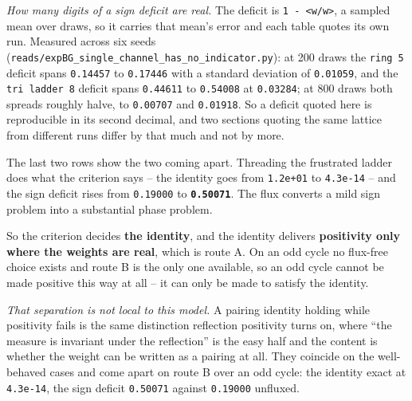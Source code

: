 \documentclass[10pt,letterpaper,twocolumn]{article}
\begin{document}
\emph{How many digits of a sign deficit are real.} The deficit is \texttt{1\ -{}\allowbreak{}\ \textbar{}\allowbreak{}\textless{}\allowbreak{}w/\allowbreak{}\textbar{}\allowbreak{}w\textbar{}\allowbreak{}\textgreater{}\allowbreak{}\textbar{}\allowbreak{}}, a sampled mean over
draws, so it carries that mean's error and each table quotes its own run. Measured across six
seeds (\texttt{reads/\allowbreak{}expBG\_\allowbreak{}single\_\allowbreak{}channel\_\allowbreak{}has\_\allowbreak{}no\_\allowbreak{}indicator.\allowbreak{}py}): at 200 draws the \texttt{ring\ 5} deficit spans
\texttt{0.\allowbreak{}14457} to \texttt{0.\allowbreak{}17446} with a standard deviation of \texttt{0.\allowbreak{}01059}, and the \texttt{tri\ ladder\ 8} deficit spans
\texttt{0.\allowbreak{}44611} to \texttt{0.\allowbreak{}54008} at \texttt{0.\allowbreak{}03284}; at 800 draws both spreads roughly halve, to \texttt{0.\allowbreak{}00707} and
\texttt{0.\allowbreak{}01918}. So a deficit quoted here is reproducible in its second decimal, and two sections quoting
the same lattice from different runs differ by that much and not by more.

The last two rows show the two coming apart. Threading the frustrated ladder does what the
criterion says -- the identity goes from \texttt{1.\allowbreak{}2e+\allowbreak{}01} to \texttt{4.\allowbreak{}3e-{}\allowbreak{}14} -- and the sign deficit rises from
\texttt{0.\allowbreak{}19000} to \textbf{\texttt{0.\allowbreak{}50071}}. The flux converts a mild sign problem into a substantial phase
problem.

So the criterion decides \textbf{the identity}, and the identity delivers \textbf{positivity only where the
weights are real}, which is route A. On an odd cycle no flux-free choice exists and route B is the
only one available, so an odd cycle cannot be made positive this way at all -- it can only be made
to satisfy the identity.

\emph{That separation is not local to this model.} A pairing identity holding while positivity fails is
the same distinction reflection positivity turns on, where ``the measure is invariant under the
reflection'' is the easy half and the content is whether the weight can be written as a pairing at
all. They coincide on the well-behaved cases and come apart on route B over an odd cycle: the
identity exact at \texttt{4.\allowbreak{}3e-{}\allowbreak{}14}, the sign deficit \texttt{0.\allowbreak{}50071} against \texttt{0.\allowbreak{}19000} unfluxed.
\end{document}
